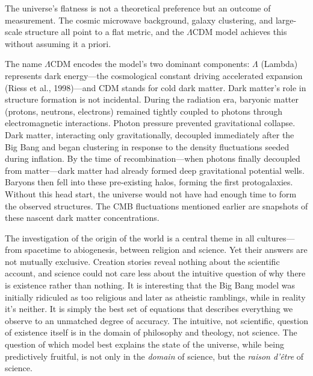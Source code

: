 The universe's flatness is not a theoretical preference but an outcome of measurement. The cosmic microwave background, galaxy clustering, and large-scale structure all point to a flat metric, and the $\Lambda$CDM model achieves this without assuming it a priori.

The name \QSOpen{}$\Lambda$CDM\QSClose{} encodes the model's two dominant components: $\Lambda$ (Lambda) represents dark energy—the cosmological constant driving accelerated expansion (Riess et al., 1998)—and CDM stands for cold dark matter. Dark matter's role in structure formation is not incidental. During the radiation era, baryonic matter (protons, neutrons, electrons) remained tightly coupled to photons through electromagnetic interactions. Photon pressure prevented gravitational collapse. Dark matter, interacting only gravitationally, decoupled immediately after the Big Bang and began clustering in response to the density fluctuations seeded during inflation. By the time of recombination—when photons finally decoupled from matter—dark matter had already formed deep gravitational potential wells. Baryons then fell into these pre-existing halos, forming the first protogalaxies. Without this head start, the universe would not have had enough time to form the observed structures. The CMB fluctuations mentioned earlier are snapshots of these nascent dark matter concentrations. 

\begin{commentary}[ex nihilo]
The investigation of the origin of \QSOpen{}the world\QSClose{} is a central theme in all cultures—from spacetime to abiogenesis, between religion and science. Yet their answers are not mutually exclusive. Creation stories reveal nothing about the scientific account, and science could not care less about the intuitive question of why there is existence rather than nothing. It is interesting that the Big Bang model was initially ridiculed as too religious and later as atheistic ramblings, while in reality it's neither. It is simply the best set of equations that describes everything we observe to an unmatched degree of accuracy. The intuitive, not scientific, question of existence itself is in the domain of philosophy and theology, not science. The question of which model best explains the state of the universe, while being predictively fruitful, is not only in the \textit{domain} of science, but the \textit{raison d'être} of science.
\end{commentary}

\newpage
\thispagestyle{empty}

